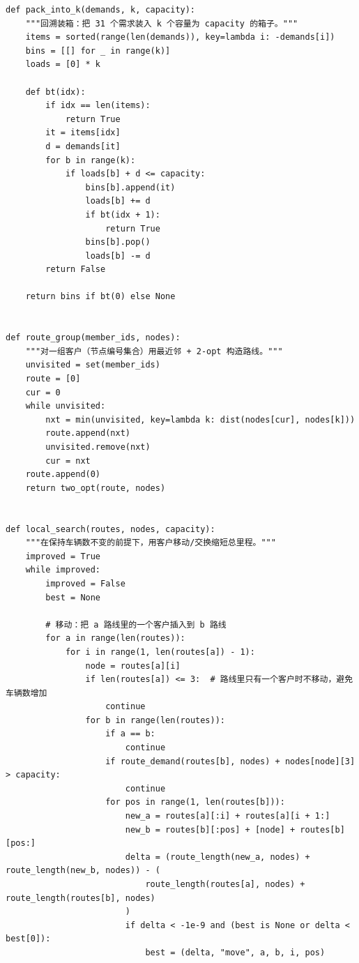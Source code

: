 \documentclass[12pt,a4paper]{ctexart}
\begin{document}
\begin{lstlisting}
def pack_into_k(demands, k, capacity):
    """回溯装箱：把 31 个需求装入 k 个容量为 capacity 的箱子。"""
    items = sorted(range(len(demands)), key=lambda i: -demands[i])
    bins = [[] for _ in range(k)]
    loads = [0] * k

    def bt(idx):
        if idx == len(items):
            return True
        it = items[idx]
        d = demands[it]
        for b in range(k):
            if loads[b] + d <= capacity:
                bins[b].append(it)
                loads[b] += d
                if bt(idx + 1):
                    return True
                bins[b].pop()
                loads[b] -= d
        return False

    return bins if bt(0) else None


def route_group(member_ids, nodes):
    """对一组客户（节点编号集合）用最近邻 + 2-opt 构造路线。"""
    unvisited = set(member_ids)
    route = [0]
    cur = 0
    while unvisited:
        nxt = min(unvisited, key=lambda k: dist(nodes[cur], nodes[k]))
        route.append(nxt)
        unvisited.remove(nxt)
        cur = nxt
    route.append(0)
    return two_opt(route, nodes)


def local_search(routes, nodes, capacity):
    """在保持车辆数不变的前提下，用客户移动/交换缩短总里程。"""
    improved = True
    while improved:
        improved = False
        best = None

        # 移动：把 a 路线里的一个客户插入到 b 路线
        for a in range(len(routes)):
            for i in range(1, len(routes[a]) - 1):
                node = routes[a][i]
                if len(routes[a]) <= 3:  # 路线里只有一个客户时不移动，避免车辆数增加
                    continue
                for b in range(len(routes)):
                    if a == b:
                        continue
                    if route_demand(routes[b], nodes) + nodes[node][3] > capacity:
                        continue
                    for pos in range(1, len(routes[b])):
                        new_a = routes[a][:i] + routes[a][i + 1:]
                        new_b = routes[b][:pos] + [node] + routes[b][pos:]
                        delta = (route_length(new_a, nodes) + route_length(new_b, nodes)) - (
                            route_length(routes[a], nodes) + route_length(routes[b], nodes)
                        )
                        if delta < -1e-9 and (best is None or delta < best[0]):
                            best = (delta, "move", a, b, i, pos)


\end{lstlisting}
\end{document}
